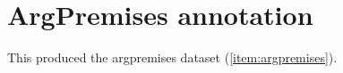 \section{ArgPremises annotation}
\label{sec:argpremises_annotation}

This produced the argpremises dataset (\ref{item:argpremises}).

